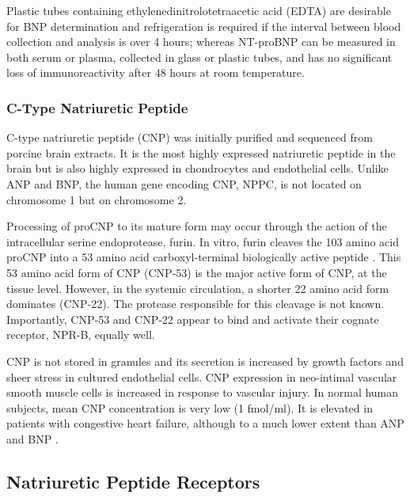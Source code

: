 \documentclass[14pt,a4paper,onecolumn]{extarticle}
\begin{document}
Plastic tubes containing ethylenedinitrolotetraacetic acid (EDTA) are desirable for BNP determination and refrigeration is required if the interval between blood collection and analysis is over 4 hours; whereas NT-proBNP can be measured in both serum or plasma, collected in glass or plastic tubes, and has no significant loss of immunoreactivity after 48 hours at room temperature. \citep{Omland2008} %



\subsubsection{C-Type Natriuretic Peptide}

C-type natriuretic peptide (CNP) was initially purified and sequenced from porcine brain extracts. It is the most highly expressed natriuretic peptide in the brain but is also highly expressed in chondrocytes and endothelial cells. Unlike ANP and BNP, the human gene encoding CNP, NPPC, is not located on chromosome 1 but on chromosome 2. %



Processing of proCNP to its mature form may occur through the action of the intracellular serine endoprotease, furin. In vitro, furin cleaves the 103 amino acid proCNP into a 53 amino acid carboxyl-terminal biologically active peptide \citep{Wu2003a}. This 53 amino acid form of CNP (CNP-53) is the major active form of CNP, at the tissue level. However, in the systemic circulation, a shorter 22 amino acid form dominates (CNP-22). The protease responsible for this cleavage is not known. Importantly, CNP-53 and CNP-22 appear to bind and activate their cognate receptor, NPR-B, equally well. %



CNP is not stored in granules and its secretion is increased by growth factors and sheer stress in cultured endothelial cells. CNP expression in neo-intimal vascular smooth muscle cells is increased in response to vascular injury. In normal human subjects, mean CNP concentration is very low (1 fmol/ml). It is elevated in patients with congestive heart failure, although to a much lower extent than ANP and BNP \citep{Charles2006} \citep{Del-Ry2005} \citep{Kalra2003}. %



\subsection{Natriuretic Peptide Receptors}
\end{document}
